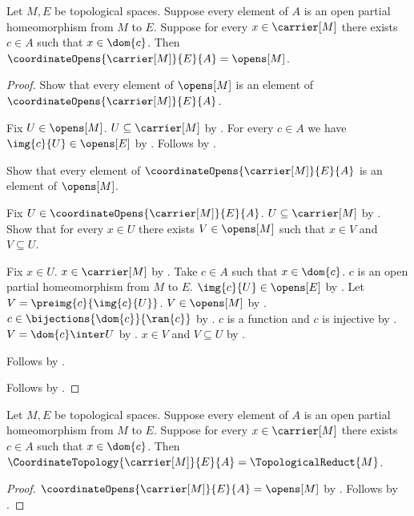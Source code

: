 \begin{theorem}\label{coordinate_opens_recovers_topology}
    Let $M,E$ be topological spaces.
    Suppose every element of $A$ is an open partial homeomorphism from $M$ to $E$.
    Suppose for every $x\in\carrier[M]$ there exists $c\in A$ such that $x\in\dom{c}$.
    Then $\coordinateOpens{\carrier[M]}{E}{A}=\opens[M]$.
\end{theorem}
\begin{proof}
    Show that every element of $\opens[M]$ is an element of
        $\coordinateOpens{\carrier[M]}{E}{A}$.
    \begin{subproof}
        Fix $U\in\opens[M]$.
        $U\subseteq\carrier[M]$ by .
        For every $c\in A$ we have $\img{c}{U}\in\opens[E]$ by
            .
        Follows by .
    \end{subproof}
    Show that every element of $\coordinateOpens{\carrier[M]}{E}{A}$
        is an element of $\opens[M]$.
    \begin{subproof}
        Fix $U\in\coordinateOpens{\carrier[M]}{E}{A}$.
        $U\subseteq\carrier[M]$ by .
        Show that for every $x\in U$ there exists $V\in\opens[M]$ such that
            $x\in V$ and $V\subseteq U$.
        \begin{subproof}
            Fix $x\in U$.
            $x\in\carrier[M]$ by .
            Take $c\in A$ such that $x\in\dom{c}$.
            $c$ is an open partial homeomorphism from $M$ to $E$.
            $\img{c}{U}\in\opens[E]$ by .
            Let $V=\preimg{c}{\img{c}{U}}$.
            $V\in\opens[M]$ by .
            $c\in\bijections{\dom{c}}{\ran{c}}$ by
                .
            $c$ is a function and $c$ is injective by
                .
            $V=\dom{c}\inter U$ by .
            $x\in V$ and $V\subseteq U$ by .
        \end{subproof}
        Follows by .
    \end{subproof}
    Follows by .
\end{proof}

\begin{theorem}\label{coordinate_topology_recovers_reduct}
    Let $M,E$ be topological spaces.
    Suppose every element of $A$ is an open partial homeomorphism from $M$ to $E$.
    Suppose for every $x\in\carrier[M]$ there exists $c\in A$ such that $x\in\dom{c}$.
    Then $\CoordinateTopology{\carrier[M]}{E}{A}=\TopologicalReduct{M}$.
\end{theorem}
\begin{proof}
    $\coordinateOpens{\carrier[M]}{E}{A}=\opens[M]$ by
        .
    Follows by .
\end{proof}


